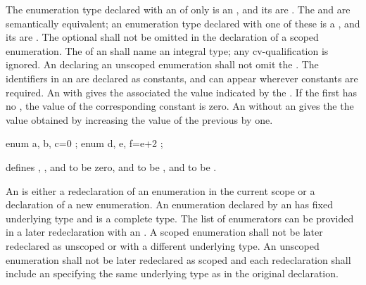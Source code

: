 \pnum
{}%
%
%
%
The enumeration type declared with an 
of only  is an ,
and its  are .
The   and
 are semantically equivalent; an enumeration
type declared with one of these is a ,
and its  are .
The optional  shall not be omitted in the declaration of a scoped enumeration.
The  of an 
shall name an integral type; any cv-qualification is ignored.
An  declaring an unscoped enumeration shall
not omit the .
The identifiers in an  are declared as
constants, and can appear wherever constants are required.
%
An  with \tcode{=} gives the associated
 the value indicated by the
.
If the first 
has no , the value of the corresponding constant
is zero. An  without an
 gives the  the value
obtained by increasing the value of the previous 
by one.

\enterexample

\begin{codeblock}
enum { a, b, c=0 };
enum { d, e, f=e+2 };
\end{codeblock}

defines , , and  to be zero,  and
 to be , and  to be .
\exitexample

\pnum
An  is either a redeclaration
of an enumeration in the current scope or a declaration of a new enumeration.
\enternote An enumeration declared by an
 has fixed underlying type and is a
complete type. The list of enumerators can be provided in a later redeclaration
with an . \exitnote A scoped enumeration
shall not be later redeclared as unscoped or with a different underlying type.
An unscoped enumeration shall not be later redeclared as scoped and each
redeclaration shall include an  specifying the same
underlying type as in the original declaration.

